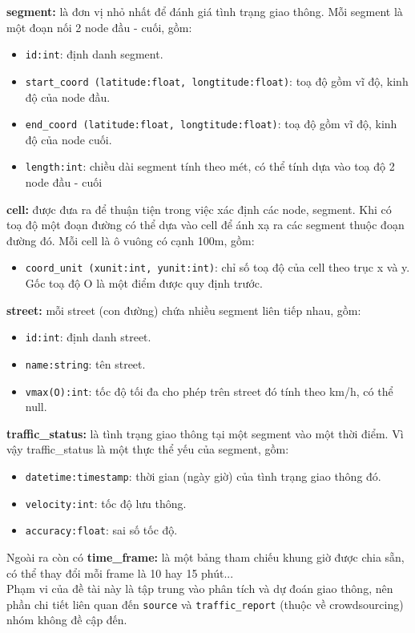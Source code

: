 \textbf{segment:} là đơn vị nhỏ nhất để đánh giá tình trạng giao thông. Mỗi segment là một đoạn nối 2 node đầu - cuối, gồm:
\begin{itemize}
    \item \lstinline{id:int}: định danh segment.
    \item \lstinline{start_coord (latitude:float, longtitude:float)}: toạ độ gồm vĩ độ, kinh độ của node đầu.
    \item \lstinline{end_coord (latitude:float, longtitude:float)}: toạ độ gồm vĩ độ, kinh độ của node cuối.
    \item \lstinline{length:int}: chiều dài segment tính theo mét, có thể tính dựa vào toạ độ 2 node đầu - cuối\\
\end{itemize}

\textbf{cell:} được đưa ra để thuận tiện trong việc xác định các node, segment. Khi có toạ độ một đoạn đường có thể dựa vào cell để ánh xạ ra các segment thuộc đoạn đường đó. Mỗi cell là ô vuông có cạnh 100m, gồm:
\begin{itemize}
    \item \lstinline{coord_unit (xunit:int, yunit:int)}: chỉ số toạ độ của cell theo trục x và y. Gốc toạ độ O là một điểm được quy định trước.\\
\end{itemize}

\textbf{street:} mỗi street (con đường) chứa nhiều segment liên tiếp nhau, gồm:
\begin{itemize}
    \item \lstinline{id:int}: định danh street.
    \item \lstinline{name:string}: tên street.
    \item \lstinline{vmax(O):int}: tốc độ tối đa cho phép trên street đó tính theo km/h, có thể null.\\
\end{itemize}

\textbf{traffic\_status:} là tình trạng giao thông tại một segment vào một thời điểm. Vì vậy traffic\_status là một thực thể yếu của segment, gồm:
\begin{itemize}
    \item \lstinline{datetime:timestamp}: thời gian (ngày giờ) của tình trạng giao thông đó.
    \item \lstinline{velocity:int}: tốc độ lưu thông.
    \item \lstinline{accuracy:float}: sai số tốc độ.\\
\end{itemize}

Ngoài ra còn có \textbf{time\_frame:} là một bảng tham chiếu khung giờ được chia sẵn, có thể thay đổi mỗi frame là 10 hay 15 phút...\\

Phạm vi của đề tài này là tập trung vào phân tích và dự đoán giao thông, nên phần chi tiết liên quan đến \lstinline{source} và \lstinline{traffic_report} (thuộc về crowdsourcing) nhóm không đề cập đến.